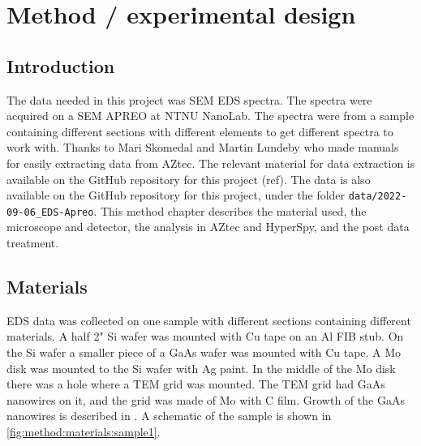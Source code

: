 \chapter{Method / experimental design}
\label{chap:method}



%
%
\section{Introduction}
\label{sec:method:intro}

The data needed in this project was SEM EDS spectra.
The spectra were acquired on a SEM APREO at NTNU NanoLab.
The spectra were from a sample containing different sections with different elements to get different spectra to work with.
Thanks to Mari Skomedal \cite{skomedal_improving_2022} and Martin Lundeby \cite{lundeby_improving_2019} who made manuals for easily extracting data from AZtec.
The relevant material for data extraction is available on the GitHub repository for this project (ref).
The data is also available on the GitHub repository for this project, under the folder \verb|data/2022-09-06_EDS-Apreo|.
This method chapter describes the material used, the microscope and detector, the analysis in AZtec and HyperSpy, and the post data treatment.



%
%
\section{Materials}
\label{sec:method:materials}
EDS data was collected on one sample with different sections containing different materials.
A half 2" Si wafer was mounted with Cu tape on an Al FIB stub.
On the Si wafer a smaller piece of a GaAs wafer was mounted with Cu tape.
A Mo disk was mounted to the Si wafer with Ag paint.
In the middle of the Mo disk there was a hole where a TEM grid was mounted.
The TEM grid had GaAs nanowires on it, and the grid was made of Mo with C film.
Growth of the GaAs nanowires is described in \cite[Ch. 3]{skomedal_improving_2022}.
A schematic of the sample is shown in \cref{fig:method:materials:sample1}.

